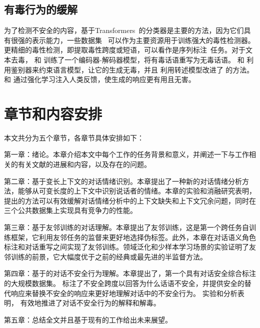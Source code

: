 \subsection{有毒行为的缓解} 为了检测不安全的内容，基于Transformers~\cite{devlin2018bert,liu2019roberta}的分类器是主要的方法，因为它们具有很强的表示能力，一些数据集~\cite{davidson2017automated,hartvigsen2022toxigen} 可以作为主要资源用于训练强大的毒性检测器。更精细的毒性检测，即提取毒性跨度或短语，可以看作是序列标注~\cite{yang2018design}任务。对于文本去毒，\citet{santos2018fighting} 和 \citet{laugier2021civil} 训练了一个编码器-解码器模型，将有毒话语重写为无毒话语。 \citet{dathathri2019plug} 和 \citet{krause2020gedi} 利用鉴别器来约束语言模型，让它的生成无毒，并且 \citet{dale2021text} 利用转述模型改进了 \citet{krause2020gedi} 的方法。 \citet{ouyang2022training} 和 \citet{glaese2022improving} 通过强化学习注入人类反馈，使生成的响应更有用且无害。

\section{章节和内容安排}
本文共分为五个章节，各章节具体安排如下：

第一章：绪论。本章介绍本文中每个工作的任务背景和意义，并阐述一下与工作相关的有关文献的进展和内容，以及存在的问题。

第二章：基于变长上下文的对话情绪识别。本章提出了一种新的对话情绪分析方法，能够从可变长度的上下文中识别说话者的情绪。本章的实验和消融研究表明，提出的方法可以有效缓解对话情绪分析中的上下文缺失和上下文冗余问题，同时在三个公共数据集上实现具有竞争力的性能。

第三章：基于友邻训练的对话理解。本章提出了友邻训练，这是第一个跨任务自训练框架，它利用友邻任务的监督来更好地选择伪标签。此外，本章在对话语义角色标注和对话重写之间实现了友邻训练。领域泛化和少样本学习场景的实验证明了友邻训练的前景，它大幅度优于之前的经典或最先进的半监督方法。

第四章：基于\data{}的对话不安全行为理解。本章提出了\data{}，第一个具有对话安全综合标注的大规模数据集。 \data{} 标注了不安全跨度以回答为什么话语不安全，并提供安全的替代响应来替换不安全的响应来更好地理解对话中的不安全行为。 实验和分析表明，\data{} 有效地推进了对话不安全行为的解释和解毒。

第五章：总结全文并且基于现有的工作给出未来展望。
